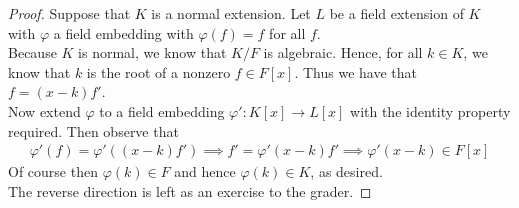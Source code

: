 \documentclass[num=7,duedate=03-24-21,course=Algebra\ II,proflastname=Walton]{hwtemplate}
\begin{document}
\begin{proof}
	Suppose that \(K\) is a normal extension. Let \(L\) be a field extension of \(K\) with \(\varphi\) a field embedding with \(\varphi (f) = f\) for all \(f\).\\

	Because \(K\) is normal, we know that \(K / F\) is algebraic. Hence, for all \(k \in K\), we know that \(k\) is the root of a nonzero \(f \in F[x]\). Thus we have that \(f = (x-k)f'\).\\

	Now extend \(\varphi \) to a field embedding \(\varphi':K[x] \to L[x]\) with the identity property required. Then observe that
	\begin{align*}
		\varphi '(f) = \varphi '((x-k)f') \implies f' = \varphi'(x-k)f' \implies \varphi '(x-k) \in F[x]
	\end{align*}
	Of course then \(\varphi (k) \in F\) and hence \(\varphi (k) \in K\), as desired.\\

	The reverse direction is left as an exercise to the grader.
\end{proof}
\end{document}
